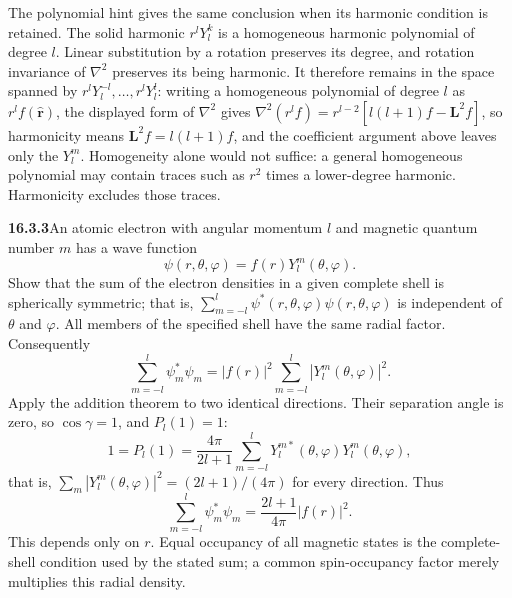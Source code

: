 The polynomial hint gives the same conclusion when its harmonic
condition is retained. The solid harmonic $r^lY_l^k$ is a homogeneous
harmonic polynomial of degree $l$. Linear substitution by a rotation
preserves its degree, and rotation invariance of $\nabla^2$ preserves
its being harmonic. It therefore remains in the space spanned by
$r^lY_l^{-l},\ldots,r^lY_l^l$: writing a homogeneous polynomial of
degree $l$ as $r^lf(\hat{\mathbf r})$, the displayed form of
$\nabla^2$ gives $\nabla^2(r^lf)=r^{l-2}[l(l+1)f-\mathbf L^2f]$, so
harmonicity means $\mathbf L^2f=l(l+1)f$, and the coefficient argument
above leaves only the $Y_l^m$. Homogeneity alone would not suffice:
a general homogeneous polynomial may contain traces such as
$r^2$ times a lower-degree harmonic. Harmonicity excludes those traces.

\par\bigskip
\noindent\textbf{16.3.3}\quad An atomic electron with angular
momentum $l$ and magnetic quantum number $m$ has a wave function
\[
\psi(r,\theta,\varphi)=f(r)Y_{l}^{m}(\theta,\varphi).
\]
Show that the sum of the electron densities in a given complete shell
is spherically symmetric; that is,
$\sum_{m=-l}^{l}\psi^{*}(r,\theta,\varphi)\psi(r,\theta,\varphi)$ is
independent of $\theta$ and $\varphi$.
\solution
All members of the specified shell have the same radial factor.
Consequently
\[
\sum_{m=-l}^{l}\psi_m^*\psi_m
=|f(r)|^2\sum_{m=-l}^{l}|Y_l^m(\theta,\varphi)|^2.
\]
Apply the addition theorem to two identical directions. Their
separation angle is zero, so $\cos\gamma=1$, and $P_l(1)=1$:
\[
1=P_l(1)=\frac{4\pi}{2l+1}
\sum_{m=-l}^{l}Y_l^{m*}(\theta,\varphi)Y_l^m(\theta,\varphi),
\]
that is, $\sum_{m}|Y_l^m(\theta,\varphi)|^2=(2l+1)/(4\pi)$ for every
direction. Thus
\[
\boxed{\sum_{m=-l}^{l}\psi_m^*\psi_m
=\frac{2l+1}{4\pi}|f(r)|^2}.
\]
This depends only on $r$. Equal occupancy of all magnetic states
is the complete-shell condition used by the stated sum; a common
spin-occupancy factor merely multiplies this radial density.

